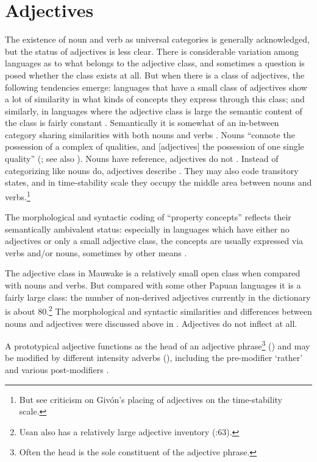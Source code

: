 \section{Adjectives}\label{sec:3:3}
{}
The existence of noun and verb as universal categories is generally acknowledged, but the status of adjectives is less clear. There is considerable variation among languages as to what belongs to the adjective class, and sometimes a question is posed whether the class exists at all. But when there is a class of adjectives, the following tendencies emerge: languages that have a small class of adjectives show a lot of similarity in what kinds of concepts they express through this class; and similarly, in languages where the adjective class is large the semantic content of the class is fairly constant \citep[20]{Dixon1977}. Semantically it is somewhat of an in-between category sharing similarities with both nouns and verbs \citep[447]{Lyons1977}. Nouns ``connote the possession of a complex of qualities, and [adjectives] the possession of one single quality'' (\citealt[81]{Jespersen1924}; see also \citealt[362]{Wierzbicka1986}). Nouns have reference, adjectives do not \citep[77]{HakulinenEtAl1979}%
. Instead of categorizing like nouns do, adjectives describe \citep[357]{Wierzbicka1986}. They may also code transitory states, and in  time-stability scale they occupy the middle area between nouns and verbs.\footnote{But see  criticism on Giv\'on's placing of adjectives on the time-stability scale.} 

The morphological and syntactic coding of ``property concepts'' reflects their semantically ambivalent status: especially in languages which have either no adjectives or only a small adjective class, the concepts are usually expressed via verbs and/or nouns, sometimes by other means \citep[20]{Dixon1977}.

The adjective class in Mauwake is a relatively small open class when compared with nouns and verbs. But compared with some other Papuan languages \citep[50--51]{Dixon1977} it is a fairly large class: the number of non-derived adjectives currently in the dictionary is about 80.\footnote{Usan also has a relatively large adjective inventory (:63).} The morphological and syntactic similarities and differences between nouns and adjectives were discussed above in . Adjectives do not inflect at all. 

A prototypical adjective functions as the head of an adjective phrase\footnote{Often the head is the sole constituent of the adjective phrase.} () and may be modified by different intensity adverbs (), including the pre-modifier  `rather'  and various post-modifiers . 

